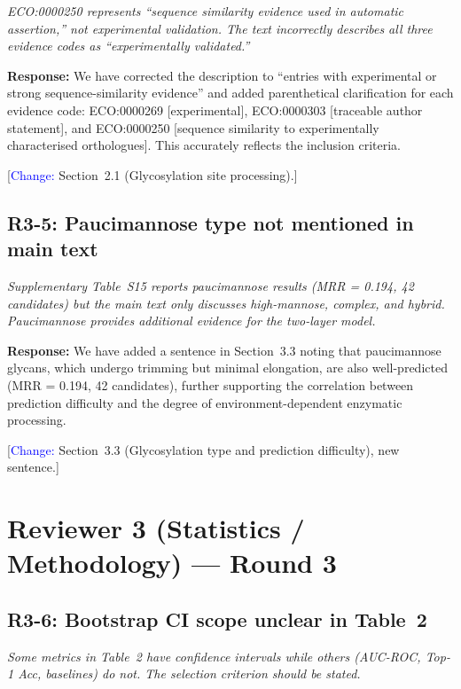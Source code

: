 \documentclass[11pt,a4paper]{article}
\begin{document}
\textit{ECO:0000250 represents ``sequence similarity evidence used in automatic
assertion,'' not experimental validation. The text incorrectly describes all
three evidence codes as ``experimentally validated.''}

\textbf{Response:} We have corrected the description to ``entries with
experimental or strong sequence-similarity evidence'' and added parenthetical
clarification for each evidence code: ECO:0000269 [experimental], ECO:0000303
[traceable author statement], and ECO:0000250 [sequence similarity to
experimentally characterised orthologues]. This accurately reflects the
inclusion criteria.

[\textcolor{blue}{Change:} Section~2.1 (Glycosylation site processing).]

\subsection*{R3-5: Paucimannose type not mentioned in main text}

\textit{Supplementary Table~S15 reports paucimannose results (MRR = 0.194, 42
candidates) but the main text only discusses high-mannose, complex, and hybrid.
Paucimannose provides additional evidence for the two-layer model.}

\textbf{Response:} We have added a sentence in Section~3.3 noting that
paucimannose glycans, which undergo trimming but minimal elongation, are also
well-predicted (MRR = 0.194, 42 candidates), further supporting the correlation
between prediction difficulty and the degree of environment-dependent enzymatic
processing.

[\textcolor{blue}{Change:} Section~3.3 (Glycosylation type and prediction
difficulty), new sentence.]

\section*{Reviewer 3 (Statistics / Methodology) --- Round 3}

\subsection*{R3-6: Bootstrap CI scope unclear in Table~2}

\textit{Some metrics in Table~2 have confidence intervals while others
(AUC-ROC, Top-1 Acc, baselines) do not. The selection criterion should be
stated.}
\end{document}
